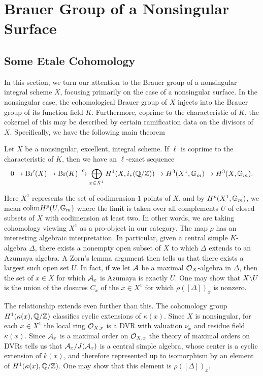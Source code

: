 
\section{Brauer Group of a Nonsingular Surface}
\subsection{Some Etale Cohomology}
In this section, we turn our attention to the Brauer group of a nonsingular integral scheme $X$, focusing primarily on the case of a nonsingular surface.  In the nonsingular case, the cohomological Brauer group of $X$ injects into the Brauer group of its function field $K$.  Furthermore, coprime to the characteristic of $K$, the cokernel of this may be described by certain ramification data on the divisors of $X$.  Specifically, we have the following main theorem
\begin{thm}
Let $X$ be a nonsingular, excellent, integral scheme.  If $\ell$ is coprime to the characteristic of $K$, then we have an $\ell$-exact sequence
$$0\rightarrow \textnormal{Br}'(X)\rightarrow\textnormal{Br}(K)\xrightarrow{\rho} \bigoplus_{x\in X^1} H^1(X,i_*(\mathbb{Q}/\mathbb{Z}))\rightarrow H^3(X^1,\mathbb{G}_m)\rightarrow H^3(X,\mathbb{G}_m).$$
\end{thm}
Here $X^1$ represents the set of codimension $1$ points of $X$, and by $H^p(X^1,\mathbb{G}_m)$, we mean $\textnormal{colim} H^p(U,\mathbb{G}_m)$ where the limit is taken over all complements $U$ of closed subsets of $X$ with codimension at least two.  In other words, we are taking cohomology viewing $X^1$ as a pro-object in our category.  The map $\rho$ has an interesting algebraic interpretation.  In particular, given a central simple $K$-algebra $\Delta$, there exists a nonempty open subset of $X$ to which $\Delta$ extends to an Azumaya algebra.  A Zorn's lemma argument then tells us that there exists a largest such open set $U$.  In fact, if we let $\mathcal{A}$ be a maximal $\mathcal{O}_X$-algebra in $\Delta$, then the set of $x\in X$ for which $\mathcal{A}_x$ is Azumaya is exactly $U$.  One may show that $X\backslash U$ is the union of the closures $C_x$ of the $x\in X^1$ for which $\rho([\Delta])_x$ is nonzero.

The relationship extends even further than this.  The cohomology group $H^1(\kappa(x),\mathbb{Q}/\mathbb{Z})$ classifies cyclic extensions of $\kappa(x)$.  Since $X$ is nonsingular, for each $x\in X^1$ the local ring $\mathcal{O}_{X,x}$ is a DVR with valuation $\nu_x$ and residue field $\kappa(x)$.  Since $\mathcal{A}_x$ is a maximal order on $\mathcal{O}_{X,x}$ the theory of maximal orders on DVRs tells us that $\mathcal{A}_x/J(\mathcal{A}_x)$ is a central simple algebra, whose center is a cyclic extension of $k(x)$, and therefore represented up to isomorphism by an element of $H^1(\kappa(x),\mathbb{Q}/\mathbb{Z})$.  One may show that this element is $\rho([\Delta])_x$.

